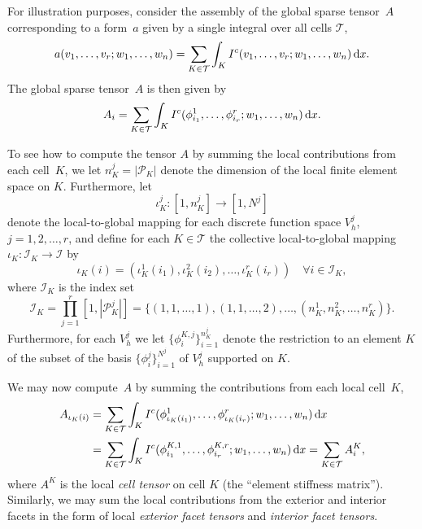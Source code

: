 For illustration purposes, consider the assembly of the global sparse
tensor~$A$ corresponding to a form~$a$ given by a single integral over
all cells $\mathcal{T}$,
\begin{equation}
  a(v_1, \ldots, v_r; w_1, \ldots, w_n) =
  \sum_{K\in\mathcal{T}} \int_K
  I^c(v_1, \ldots, v_r; w_1, \ldots, w_n) \, \mathrm{d}x.
\end{equation}
The global sparse tensor~$A$ is then given by
\begin{equation}
  A_i = \sum_{K\in\mathcal{T}} \int_K
  I^c(\phi^1_{i_1}, \ldots, \phi^r_{i_r}; w_1, \ldots, w_n) \, \mathrm{d}x.
\end{equation}

To see how to compute the tensor $A$ by summing the local
contributions from each cell~$K$, we let $n^j_K = |\mathcal{P}_K|$
denote the dimension of the local finite
element space on $K$. Furthermore, let
\begin{equation}
  \iota_K^j : [1,n_K^j] \rightarrow [1,N^j] \label{eq:iota_K}
\end{equation}
denote the local-to-global mapping for each discrete
function space $V_h^j$, $j=1,2,\ldots,r$, and define for each $K \in
\mathcal{T}$ the collective local-to-global mapping $\iota_K :
\mathcal{I}_K \rightarrow \mathcal{I}$ by
\begin{equation}
  \iota_K(i) =
  (\iota_K^1(i_1),\iota_K^2(i_2),\ldots,\iota_K^r(i_r))
  \quad \forall i \in \mathcal{I}_K,
\end{equation}
where $\mathcal{I}_K$ is the index set
\begin{equation}
  \mathcal{I}_K = 
  \prod_{j=1}^r[1,|\mathcal{P}_K^j|] = \{(1,1,\ldots,1), (1,1,\ldots,2), \ldots,
  (n_K^1,n_K^2,\ldots,n_K^r)\}.
\end{equation}
Furthermore, for each $V_h^j$ we let $\{\phi^{K,j}_i\}_{i=1}^{n_K^j}$
denote the restriction to an element $K$ of the subset of the basis
$\{\phi_i^j\}_{i=1}^{N^j}$ of $V_h^j$ supported on $K$.

We may now compute~$A$ by summing the contributions from
each local cell~$K$,
\begin{equation}
  \begin{split}
  A_{\iota_K(i)}
  &=
  \sum_{K\in\mathcal{T}} \int_K
  I^c(\phi_{\iota_K(i_1)}^1, \ldots, \phi_{\iota_K(i_r)}^r; w_1, \ldots, w_n) \, \mathrm{d}x \\
  &=
  \sum_{K\in\mathcal{T}} \int_K
  I^c(\phi_{i_1}^{K,1},
      \ldots,
      \phi_{i_r}^{K,r}; w_1, \ldots, w_n) \, \mathrm{d}x
  =
  \sum_{K\in\mathcal{T}}
  A^K_i,
  \end{split}
\end{equation}
where $A^K$ is the local \emph{cell tensor} on cell $K$ (the ``element
stiffness matrix''). Similarly, we may sum the local contributions
from the exterior and interior facets in the form of local
\emph{exterior facet tensors} and \emph{interior facet tensors}.

